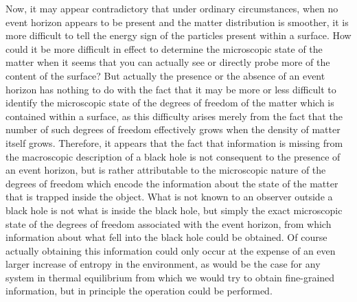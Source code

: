 \documentclass[notitlepage,12pt]{report}
\begin{document}
Now, it may appear contradictory that under ordinary circumstances, when no event horizon appears to be present and the matter distribution is smoother, it is more difficult to tell the energy sign of the particles present within a surface. How could it be more difficult in effect to determine the microscopic state of the matter when it seems that you can actually see or directly probe more of the content of the surface? But actually the presence or the absence of an event horizon has nothing to do with the fact that it may be more or less difficult to identify the microscopic state of the degrees of freedom of the matter which is contained within a surface, as this difficulty arises merely from the fact that the number of such degrees of freedom effectively grows when the density of matter itself grows. Therefore, it appears that the fact that information is missing from the macroscopic description of a black hole is not consequent to the presence of an event horizon, but is rather attributable to the microscopic nature of the degrees of freedom which encode the information about the state of the matter that is trapped inside the object. What is not known to an observer outside a black hole is not what is inside the black hole, but simply the exact microscopic state of the degrees of freedom associated with the event horizon, from which information about what fell into the black hole could be obtained. Of course actually obtaining this information could only occur at the expense of an even larger increase of entropy in the environment, as would be the case for any system in thermal equilibrium from which we would try to obtain fine-grained information, but in principle the operation could be performed.
\end{document}
